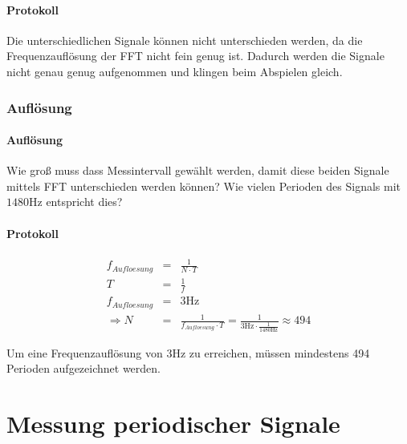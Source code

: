 \documentclass[10pt]{scrreprt}
\begin{document}
        \paragraph{Protokoll}

        Die unterschiedlichen Signale können nicht unterschieden werden, da die
        Frequenzauflösung der FFT nicht fein genug ist. Dadurch werden die Signale nicht genau
        genug aufgenommen und klingen beim Abspielen gleich.

        \subsubsection{Auflösung}
        \paragraph{Auflösung}
        Wie groß muss dass Messintervall gewählt werden, damit diese beiden Signale
        mittels FFT unterschieden werden können? Wie vielen Perioden des Signals mit
        $1480\si{\hertz}$ entspricht dies?
        \paragraph{Protokoll}

        \begin{eqnarray*}
            f_{Aufloesung} &=& \frac{1}{N \cdot T}\\
            T &=& \frac{1}{f}\\
            f_{Aufloesung} &=& 3 \si{\hertz}\\
            \Rightarrow N &=& \frac{1}{f_{Aufloesung} \cdot T} = \frac{1}{3 \si{\hertz} \cdot \frac{1}{1480\si{\hertz}}} \approx 494
        \end{eqnarray*}

        Um eine Frequenzauflösung von $3\si{\hertz}$ zu erreichen, müssen mindestens
        494 Perioden aufgezeichnet werden.

        \section{Messung periodischer Signale}
\end{document}
